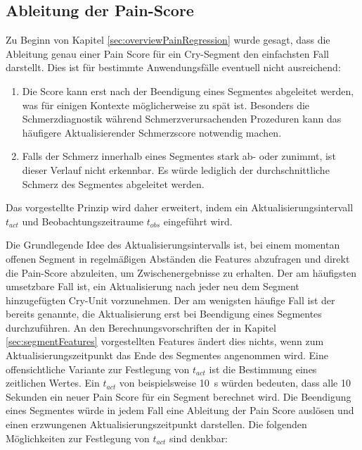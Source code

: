 \subsection{Ableitung der Pain-Score}
\label{sec:regressionPainScore}

Zu Beginn von Kapitel \ref{sec:overviewPainRegression} wurde gesagt, dass die Ableitung genau einer Pain Score für ein Cry-Segment den einfachsten Fall darstellt. Dies ist für bestimmte Anwendungsfälle eventuell nicht ausreichend: 
\begin{enumerate}
\item Die Score kann erst nach der Beendigung eines Segmentes abgeleitet werden, was für einigen Kontexte möglicherweise zu spät ist. Besonders die Schmerzdiagnostik während Schmerzverursachenden Prozeduren kann das häufigere \glqq Aktualisieren\grqq der Schmerzscore notwendig machen.
\item Falls der Schmerz innerhalb eines Segmentes stark ab- oder zunimmt, ist dieser Verlauf nicht erkennbar. Es würde lediglich der \glqq durchschnittliche Schmerz\grqq{} des Segmentes abgeleitet werden.
\end{enumerate}

Das vorgestellte Prinzip wird daher erweitert, indem ein Aktualisierungsintervall $t_{act}$ und Beobachtungszeitraume $t_{obs}$ eingeführt wird.

 Die Grundlegende Idee des Aktualisierungsintervalls ist, bei einem momentan offenen Segment in regelmäßigen Abständen die Features abzufragen und direkt die Pain-Score abzuleiten, um Zwischenergebnisse zu erhalten. Der am häufigsten umsetzbare Fall ist, ein Aktualisierung nach jeder neu dem Segment hinzugefügten Cry-Unit vorzunehmen. Der am wenigsten häufige Fall ist der bereits genannte, die Aktualisierung erst bei Beendigung eines Segmentes durchzuführen. An den Berechnungsvorschriften der in Kapitel \ref{sec:segmentFeatures} vorgestellten Features ändert dies nichts, wenn zum Aktualisierungszeitpunkt das Ende des Segmentes angenommen wird. Eine offensichtliche Variante zur Festlegung von $t_{act}$ ist die Bestimmung eines zeitlichen Wertes. Ein $t_{act}$ von beispielsweise \SI{10}{\second} würden bedeuten, dass alle 10 Sekunden ein neuer Pain Score für ein Segment berechnet wird. Die Beendigung eines Segmentes würde in jedem Fall eine Ableitung der Pain Score auslösen und einen \glqq erzwungenen Aktualisierungszeitpunkt\grqq{} darstellen. Die folgenden Möglichkeiten zur Festlegung von $t_{act}$ sind denkbar:
 
